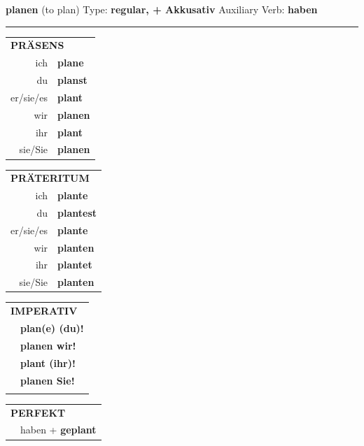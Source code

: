 \documentclass[10pt,a4paper]{revtex4-2}
\begin{document}
\begin{verbbox-acc}
    {\Large \bf planen} (to plan) \hfill Type: \textbf{regular, + Akkusativ} \hfill Auxiliary Verb: \textbf{haben} 
    
     \vspace{5pt}

    \hrule
    
    \vspace{5pt}

  \begin{tabular}{rl}
     \multicolumn{2}{l}{\textbf{PRÄSENS} }\\
    ich & \textbf{plane}\\
    du & \textbf{planst}\\
    er/sie/es & \textbf{plant}\\
    wir & \textbf{planen}\\
    ihr & \textbf{plant}\\
    sie/Sie & \textbf{planen}\\
  \end{tabular}
  \hfill
     \begin{tabular}{rl}
    \multicolumn{2}{l}{\textbf{PRÄTERITUM} }\\
    ich & \textbf{plante}\\
    du & \textbf{plantest}\\
    er/sie/es & \textbf{plante}\\
    wir & \textbf{planten}\\
    ihr & \textbf{plantet}\\
    sie/Sie & \textbf{planten}\\
  \end{tabular}
  \hfill
  \begin{tabular}{rl}
     \multicolumn{2}{l}{\textbf{IMPERATIV} }\\
   & \textbf{plan(e) (du)!}\\
   & \textbf{planen wir!}\\
   & \textbf{plant (ihr)!}\\
   & \textbf{planen Sie!}\\
   & \vspace{10pt}
  \end{tabular}

    \vspace{10pt}

 \begin{tabular}{rl}
     \multicolumn{2}{l}{\textbf{PERFEKT}}\\
   & haben + \textbf{geplant}\\
  \end{tabular}
\hfill
   \begin{tabular}{rl}
   

\end{tabular}
\end{verbbox-acc}
\end{document}
